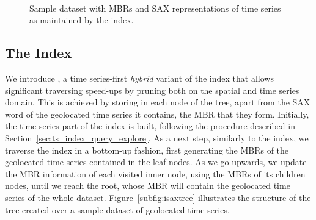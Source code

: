 \begin{figure}[!tb]
 \centering
  \\
 \caption{Sample dataset with MBRs and SAX representations of time series as maintained by the \hisax index.}
 \label{fig:example}
\end{figure}

\subsection{The \hisax Index}
\label{subsec:hisax}

We introduce \hisax, a time series-first {\em hybrid} variant of the \isax index that allows significant traversing speed-ups by pruning both on the spatial and time series domain. This is achieved by storing in each node of the tree, apart from the SAX word of the geolocated time series it contains, the MBR that they form. Initially, the time series part of the index is built, following the procedure described in Section~\ref{sec:ts_index_query_explore}. As a next step, similarly to the \btsr index, we traverse the index in a bottom-up fashion, first generating the MBRs of the geolocated time series contained in the leaf nodes. As we go upwards, we update the MBR information of each visited inner node, using the MBRs of its children nodes, until we reach the root, whose MBR will contain the geolocated time series of the whole dataset. Figure~\ref{subfig:isaxtree} illustrates the structure of the \hisax tree created over a sample dataset of geolocated time series.

